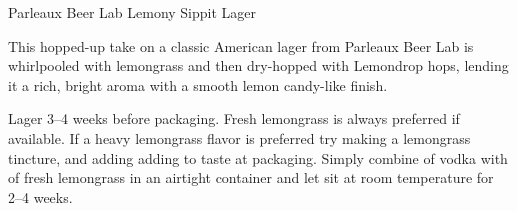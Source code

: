 \stylesection{\styleamericanlager}

\begin{recipie}{Parleaux Beer Lab Lemony Sippit Lager}

\begin{aboutblock}
This hopped-up take on a classic American lager from Parleaux Beer Lab is whirlpooled
with lemongrass and then dry-hopped with Lemondrop hops, lending it a rich, bright
aroma with a smooth lemon candy-like finish.
\end{aboutblock}


\begin{methodandtiming}
  
\begin{mashsteps}
\end{mashsteps}

\begin{fermentationsteps}
\end{fermentationsteps}

\begin{directions}
Lager 3--4 weeks before packaging. Fresh lemongrass is always preferred if available.
If a heavy lemongrass flavor is preferred try making a lemongrass tincture, and adding
adding to taste at packaging. Simply combine  of vodka with  of fresh
lemongrass in an airtight container and let sit at room temperature for 2--4 weeks.
\end{directions}

\end{methodandtiming}

\pagebreak

\begin{ingredientsblock}

\begin{malts}
\end{malts}

\begin{hops}
\end{hops}

\begin{yeasts}
\end{yeasts}

\end{ingredientsblock}

\end{recipie}

